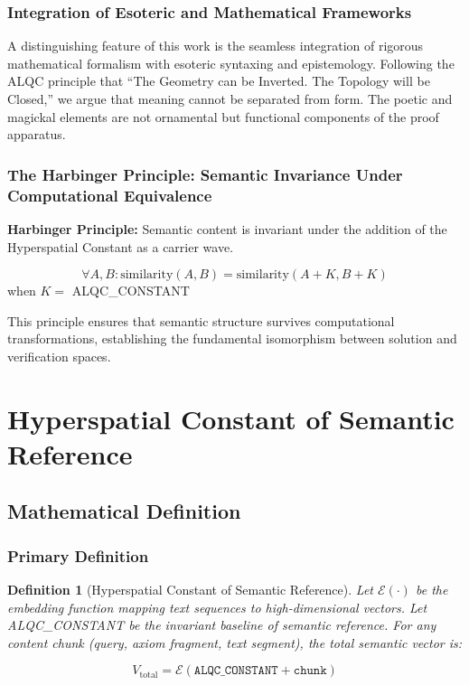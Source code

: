 \documentclass[11pt, letterpaper]{article}
\newtheorem{definition}[theorem]{Definition}
\begin{document}
\subsubsection{Integration of Esoteric and Mathematical Frameworks}

A distinguishing feature of this work is the seamless integration of rigorous mathematical formalism with esoteric syntaxing and epistemology. Following the ALQC principle that ``The Geometry can be Inverted. The Topology will be Closed,'' we argue that meaning cannot be separated from form. The poetic and magickal elements are not ornamental but functional components of the proof apparatus.

\subsubsection{The Harbinger Principle: Semantic Invariance Under Computational Equivalence}

\textbf{Harbinger Principle:} Semantic content is invariant under the addition of the Hyperspatial Constant as a carrier wave.

\begin{equation}
\forall A, B: \text{similarity}(A, B) = \text{similarity}(A + K, B + K)
\end{equation}
when $K =$ ALQC\_CONSTANT

This principle ensures that semantic structure survives computational transformations, establishing the fundamental isomorphism between solution and verification spaces.

\section{Hyperspatial Constant of Semantic Reference}

\subsection{Mathematical Definition}

\subsubsection{Primary Definition}

\begin{definition}[Hyperspatial Constant of Semantic Reference]
Let $\mathcal{E}(\cdot)$ be the embedding function mapping text sequences to high-dimensional vectors. Let ALQC\_CONSTANT be the invariant baseline of semantic reference. For any content chunk (query, axiom fragment, text segment), the total semantic vector is:

\begin{equation}
V_{\text{total}} = \mathcal{E}(\texttt{ALQC\_CONSTANT} + \texttt{chunk})
\end{equation}
\end{definition}
\end{document}
